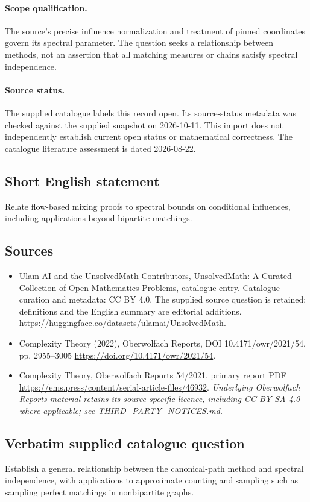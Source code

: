 \documentclass[11pt]{article}
\begin{document}
\paragraph{Scope qualification.}
The source's precise influence normalization and treatment of pinned coordinates govern its spectral parameter. The question seeks a relationship between methods, not an assertion that all matching measures or chains satisfy spectral independence.
\paragraph{Source status.}
The supplied catalogue labels this record open. Its source-status metadata was checked against the supplied snapshot on 2026-10-11. This import does not independently establish current open status or mathematical correctness. The catalogue literature assessment is dated 2026-08-22.
\subsection{Short English statement}
Relate flow-based mixing proofs to spectral bounds on conditional influences, including applications beyond bipartite matchings.
\subsection{Sources}
\begin{itemize}
\item[S1] Ulam AI and the UnsolvedMath Contributors, UnsolvedMath: A Curated Collection of Open Mathematics Problems, catalogue entry. Catalogue curation and metadata: CC BY 4.0. The supplied source question is retained; definitions and the English summary are editorial additions.
\url{https://huggingface.co/datasets/ulamai/UnsolvedMath}.
\item[S2] Complexity Theory (2022), Oberwolfach Reports, DOI 10.4171/owr/2021/54, pp. 2955--3005
\url{https://doi.org/10.4171/owr/2021/54}.
\item[S3] Complexity Theory, Oberwolfach Reports 54/2021, primary report PDF
\url{https://ems.press/content/serial-article-files/46932}.
\textit{Underlying Oberwolfach Reports material retains its source-specific licence, including CC BY-SA 4.0 where applicable; see THIRD\_PARTY\_NOTICES.md.}
\end{itemize}
\subsection{Verbatim supplied catalogue question}
Establish a general relationship between the canonical-path method and spectral independence, with applications to approximate counting and sampling such as sampling perfect matchings in nonbipartite graphs.
\end{document}
